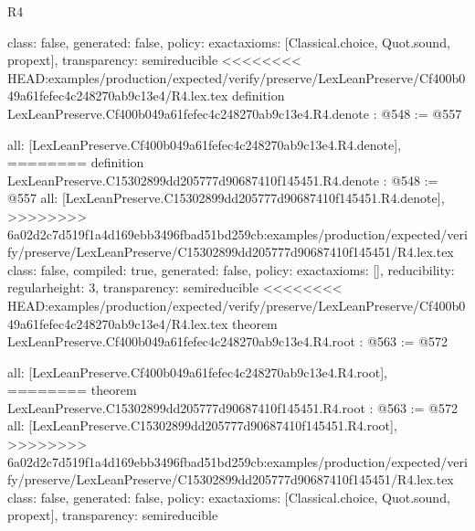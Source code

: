 \begin{lexlean}{R4}
\begin{coremodule}
{{{{{{{  class: false,
  generated: false,
  policy: exact{axioms: [Classical.choice, Quot.sound, propext]},
  transparency: semireducible
}
<<<<<<<< HEAD:examples/production/expected/verify/preserve/LexLeanPreserve/Cf400b049a61fefec4c248270ab9c13e4/R4.lex.tex
definition LexLeanPreserve.Cf400b049a61fefec4c248270ab9c13e4.R4.denote : @548 := @557 {
  all: [LexLeanPreserve.Cf400b049a61fefec4c248270ab9c13e4.R4.denote],
========
definition LexLeanPreserve.C15302899dd205777d90687410f145451.R4.denote : @548 := @557 {
  all: [LexLeanPreserve.C15302899dd205777d90687410f145451.R4.denote],
>>>>>>>> 6a02d2c7d519f1a4d169ebb3496fbad51bd259cb:examples/production/expected/verify/preserve/LexLeanPreserve/C15302899dd205777d90687410f145451/R4.lex.tex
  class: false,
  compiled: true,
  generated: false,
  policy: exact{axioms: []},
  reducibility: regular{height: 3},
  transparency: semireducible
}
<<<<<<<< HEAD:examples/production/expected/verify/preserve/LexLeanPreserve/Cf400b049a61fefec4c248270ab9c13e4/R4.lex.tex
theorem LexLeanPreserve.Cf400b049a61fefec4c248270ab9c13e4.R4.root : @563 := @572 {
  all: [LexLeanPreserve.Cf400b049a61fefec4c248270ab9c13e4.R4.root],
========
theorem LexLeanPreserve.C15302899dd205777d90687410f145451.R4.root : @563 := @572 {
  all: [LexLeanPreserve.C15302899dd205777d90687410f145451.R4.root],
>>>>>>>> 6a02d2c7d519f1a4d169ebb3496fbad51bd259cb:examples/production/expected/verify/preserve/LexLeanPreserve/C15302899dd205777d90687410f145451/R4.lex.tex
  class: false,
  generated: false,
  policy: exact{axioms: [Classical.choice, Quot.sound, propext]},
  transparency: semireducible
}

}}}}}}}}
\end{coremodule}
\end{lexlean}
